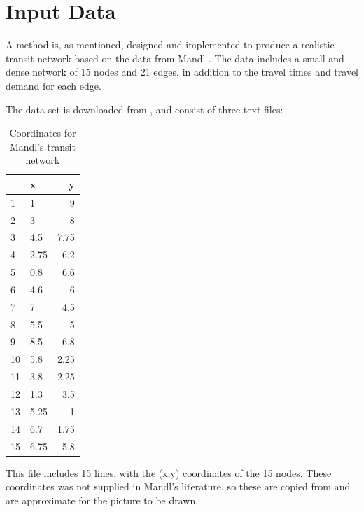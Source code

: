 \chapter{Input Data}
\label{sec:inputData}

A method is, as mentioned, designed and implemented to produce a realistic transit network based on the data from Mandl \citep{mandl79}. The data includes a small and dense network of 15 nodes and 21 edges, in addition to the travel times and travel demand for each edge. %

The data set is downloaded from \citet{mumford13}, and consist of three text files:

\begin{table}[H]
    \begin{center}
        \begin{tabular}{|l|lr|}
     	\hline
     	~ & x & y \\
     	\hline
        1 & 1 & 9 \\
        2 & 3 & 8 \\
        3 & 4.5 & 7.75 \\
        4 & 2.75 & 6.2 \\
        5 & 0.8 & 6.6 \\
        6 & 4.6 & 6 \\
        7 & 7 & 4.5 \\
        8 & 5.5 & 5 \\
        9 & 8.5 & 6.8 \\
        10 & 5.8 & 2.25 \\
        11 & 3.8 & 2.25 \\
        12 & 1.3 & 3.5 \\
    	13 & 5.25 & 1 \\
    	14 & 6.7 & 1.75 \\
    	15 & 6.75 & 5.8 \\
    	\hline
        \end{tabular}
    \end{center}
    \caption {Coordinates for Mandl's transit network}
    \label{table:MandlCoords}
    This file includes 15 lines, with the (x,y) coordinates of the 15 nodes. These coordinates was not supplied in Mandl's literature, so these are copied from \citet{mumford13} and are approximate for the picture to be drawn.
\end{table}

